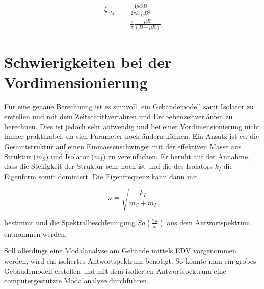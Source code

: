 \begin{align}
\xi_{eff} &= \frac{4 \mu G D}{2 \pi k_{eff} D^2}\nonumber\\
          &= \frac{2}{\pi} \frac{\mu R}{(D + \mu R)}\label{xieff}
\end{align}



\pagebreak

\section{Schwierigkeiten bei der Vordimensionierung}
\label{sec:schwierigkeitenvordimensionierung}

Für eine genaue Berechnung ist es sinnvoll, ein Gebäudemodell samt Isolator zu erstellen und mit dem Zeitschrittverfahren und Erdbebenzeitverläufen zu berechnen. Dies ist jedoch sehr aufwendig und bei einer Vordimensionierung nicht immer praktikabel, da sich Parameter noch ändern können.
Ein Ansatz ist es, die Gesamtstruktur auf einen Einmassenschwinger mit der effektiven Masse aus Struktur ($m_S$) und Isolator ($m_I$) zu vereinfachen. Er beruht auf der Annahme, dass die Steifigkeit der Struktur sehr hoch ist und die des Isolators $k_I$ die Eigenform somit dominiert. \cite{Kelly2}
Die Eigenfrequenz kann dann mit

\begin{equation}
\omega = \sqrt{\frac{k_I}{m_S + m_I}}
\end{equation}

bestimmt und die Spektralbeschleunigung $Sa(\frac{2 \pi}{\omega})$ aus dem Antwortspektrum entnommen werden.

Soll allerdings eine Modalanalyse am Gebäude mittels EDV vorgenommen werden, wird ein isoliertes Antwortspektrum benötigt.
So könnte man ein grobes Gebäudemodell erstellen und mit dem isolierten Antwortspektrum eine computergestützte Modalanalyse durchführen.

\pagebreak